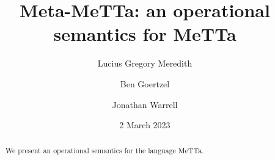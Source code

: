 \def\lastname{Meredith}

\title{Meta-MeTTa: an operational semantics for MeTTa}

\date{2 March 2023}

\author{ Lucius Gregory Meredith \\
         \and 
         Ben Goertzel
         \and Jonathan Warrell
}
 

\maketitle              %


\begin{abstract}

  We present an operational semantics for the language MeTTa.

\end{abstract}



